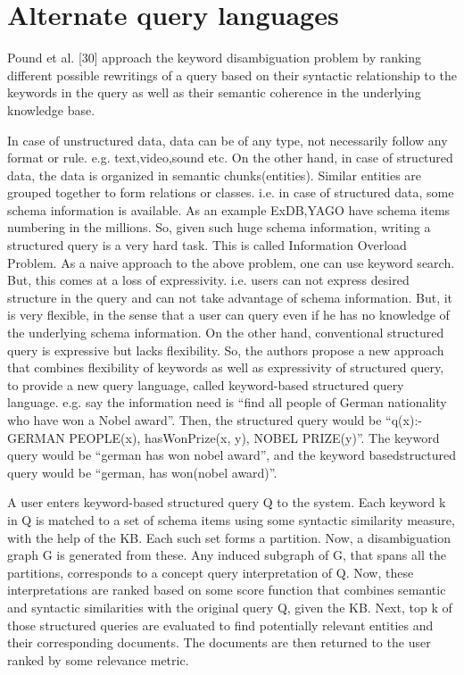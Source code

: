 \section{Alternate query languages}
Pound et al. [30] approach the keyword disambiguation problem by ranking different possible rewritings of a query based on their syntactic relationship to the keywords in the query as well as their semantic coherence in the underlying knowledge base. 

In case of unstructured data,
data can be of any type, not necessarily follow any format or rule. e.g. text,video,sound etc. On the other
hand, in case of structured data, the data is organized in semantic chunks(entities). Similar entities are
grouped together to form relations or classes. i.e. in case of structured data, some schema information is
available. As an example ExDB,YAGO have schema items numbering in the millions. So, given such huge
schema information, writing a structured query is a very hard task. This is called Information Overload
Problem. As a naive approach to the above problem, one can use keyword search. But, this comes at a loss of expressivity.
i.e. users can not express desired structure in the query and can not take advantage of schema
information. But, it is very flexible, in the sense that a user can query even if he has no knowledge of the
underlying schema information. On the other hand, conventional structured query is expressive but lacks
flexibility. So, the authors propose a new approach that combines flexibility of keywords as well as expressivity
of structured query, to provide a new query language, called keyword-based structured query
language. e.g. say the information need is “find all people of German nationality who have won a Nobel
award”. Then, the structured query would be
“q(x):- GERMAN PEOPLE(x), hasWonPrize(x, y), NOBEL PRIZE(y)”. The keyword query would be “german
has won nobel award”, and the keyword basedstructured
query would be “german, has won(nobel award)”.


A user enters keyword-based structured query Q to the system. Each keyword k in Q is matched to a set
of schema items using some syntactic similarity measure, with the help of the KB. Each such set forms a
partition. Now, a disambiguation graph G is generated from these. Any induced subgraph of G, that spans
all the partitions, corresponds to a concept query interpretation of Q. Now, these interpretations are ranked
based on some score function that combines semantic and syntactic similarities with the original query Q,
given the KB. Next, top k of those structured queries are evaluated to find potentially relevant entities
and their corresponding documents. The documents are then returned to the user ranked by some relevance
metric.

